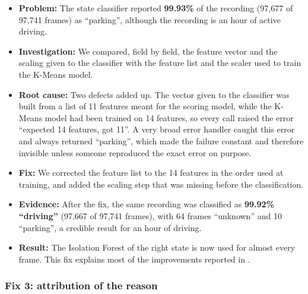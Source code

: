 \begin{itemize}
    \item \textbf{Problem:} The state classifier reported \textbf{99.93\%} of the recording (97{,}677 of 97{,}741 frames) as ``parking'', although the recording is an hour of active driving.
    \item \textbf{Investigation:} We compared, field by field, the feature vector and the scaling given to the classifier with the feature list and the scaler used to train the K-Means model.
    \item \textbf{Root cause:} Two defects added up. The vector given to the classifier was built from a list of 11 features meant for the scoring model, while the K-Means model had been trained on 14 features, so every call raised the error ``expected 14 features, got 11''. A very broad error handler caught this error and always returned ``parking'', which made the failure constant and therefore invisible unless someone reproduced the exact error on purpose.
    \item \textbf{Fix:} We corrected the feature list to the 14 features in the order used at training, and added the scaling step that was missing before the classification.
    \item \textbf{Evidence:} After the fix, the same recording was classified as \textbf{99.92\% ``driving''} (97{,}667 of 97{,}741 frames), with 64 frames ``unknown'' and 10 ``parking'', a credible result for an hour of driving.
    \item \textbf{Result:} The Isolation Forest of the right state is now used for almost every frame. This fix explains most of the improvements reported in .
\end{itemize}

\subsubsection{Fix 3: attribution of the reason}

